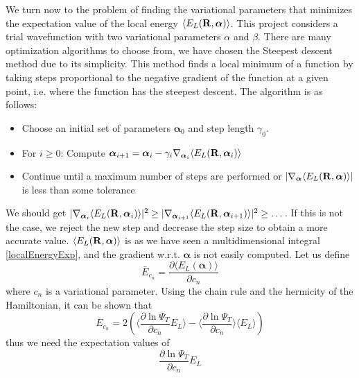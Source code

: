 \documentclass[english, a4paper]{article}
\begin{document}
We turn now to the problem of finding the variational parameters that minimizes the expectation value
of the local energy $\langle E_L({\bf R}, \boldsymbol{\alpha}) \rangle$. This project considers a trial wavefunction
with two variational parameters $\alpha$ and  $\beta$. 
There are many optimization algorithms to choose from, we have chosen the Steepest 
descent method due to its simplicity. This method finds a local minimum of a function by taking steps proportional 
to the negative gradient of the function at a given point, i.e. where the function has the steepest descent.
The algorithm is as follows:
\begin{itemize}
 \item Choose an initial set of parameters $\boldsymbol{\alpha}_0$ and step length $\gamma_0$.
 \item For $i \geq 0$: Compute $\boldsymbol{\alpha}_{i+1} = \boldsymbol{\alpha}_i - \gamma_i 
 \nabla_{\boldsymbol{\alpha}_i} \langle E_L({\bf R}, \boldsymbol{\alpha}_i) \rangle$
 \item Continue until a maximum number of steps are performed or 
 $|\nabla_{\boldsymbol{\alpha}} \langle E_L({\bf R}, \boldsymbol{\alpha}) \rangle|$ is
       less than some tolerance
\end{itemize}
We should get $|\nabla_{\boldsymbol{\alpha}_i}\langle E_L({\bf R}, 
\boldsymbol{\alpha}_i) \rangle|^2 \geq |\nabla_{\boldsymbol{\alpha}_{i+1}}\langle 
E_L({\bf R}, \boldsymbol{\alpha}_{i+1}) \rangle|^2 \geq \dots$.
If this is not the case, we reject the new step and decrease the step size to obtain a more
accurate value. 
$\langle E_L({\bf R}, \boldsymbol{\alpha}) \rangle$ is as we have seen a multidimensional integral \eqref{localEnergyExp}, 
and the gradient w.r.t. $\boldsymbol{\alpha}$
is not easily computed.
Let us define
\begin{equation}
 \bar{E}_{c_n} = \frac{\partial \langle E_L(\boldsymbol{\alpha}) \rangle}{\partial c_n}
\end{equation}
where $c_n$ is a variational parameter.
Using the chain rule and the hermicity of the Hamiltonian,
it can be shown that
\begin{equation}
 \bar{E}_{c_n} = 2 \left( \Bigr\langle \frac{\partial \ln{\Psi_T}}{\partial c_n} E_L 
 \Bigr\rangle 
 - \Bigr\langle \frac{\partial \ln{\Psi_T}}{\partial c_n}\Bigr\rangle \langle E_L \rangle   \right)
 \label{localenergyalpha}
\end{equation}
thus we need the expectation values of
\begin{equation}
 \frac{\partial \ln{\Psi_T}}{\partial c_n} E_L
\end{equation}
\end{document}
